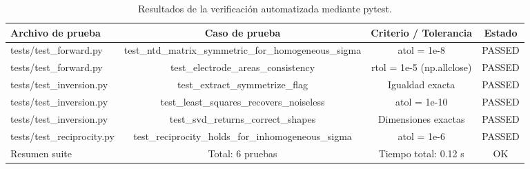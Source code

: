 \begin{table}[htbp]
\centering
\caption{Resultados de la verificación automatizada mediante pytest.}
\label{tab:pruebas_unitarias}
\begin{tabular}{lccc}
\hline
Archivo de prueba & Caso de prueba & Criterio / Tolerancia & Estado \\
\hline
tests/test\_forward.py & test\_ntd\_matrix\_symmetric\_for\_homogeneous\_sigma & atol = 1e-8 & PASSED \\
tests/test\_forward.py & test\_electrode\_areas\_consistency & rtol = 1e-5 (np.allclose) & PASSED \\
tests/test\_inversion.py & test\_extract\_symmetrize\_flag & Igualdad exacta & PASSED \\
tests/test\_inversion.py & test\_least\_squares\_recovers\_noiseless & atol = 1e-10 & PASSED \\
tests/test\_inversion.py & test\_svd\_returns\_correct\_shapes & Dimensiones exactas & PASSED \\
tests/test\_reciprocity.py & test\_reciprocity\_holds\_for\_inhomogeneous\_sigma & atol = 1e-6 & PASSED \\
Resumen suite & Total: 6 pruebas & Tiempo total: 0.12 s & OK \\
\hline
\end{tabular}
\end{table}
